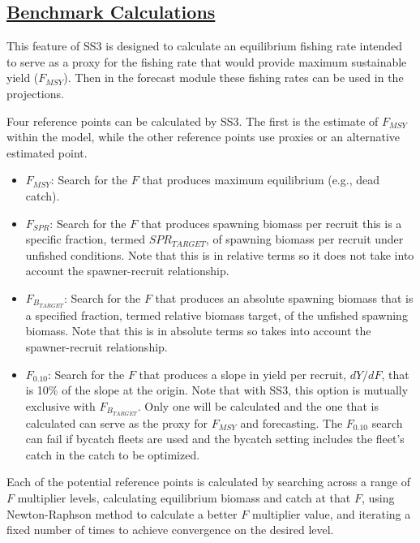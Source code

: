 \hypertarget{Benchmark}{}
\subsection[Benchmark Calculations]{\protect\hyperlink{Benchmark}{Benchmark Calculations}}
This feature of SS3 is designed to calculate an equilibrium fishing rate intended to serve as a proxy for the fishing rate that would provide maximum sustainable yield ($F_{MSY}$). Then in the forecast module these fishing rates can be used in the projections.

Four reference points can be calculated by SS3. The first is the estimate of $F_{MSY}$ within the model, while the other reference points use proxies or an alternative estimated point.

\begin{itemize}
	\item $F_{MSY}$: Search for the $F$ that produces maximum equilibrium (e.g., dead catch).
	
	\item $F_{SPR}$: Search for the $F$ that produces spawning biomass per recruit this is a specific fraction, termed $SPR_{TARGET}$, of spawning biomass per recruit under unfished conditions. Note that this is in relative terms so it does not take into account the spawner-recruit relationship.
	
	\item $F_{B_{TARGET}}$: Search for the $F$ that produces an absolute spawning biomass that is a specified fraction, termed relative biomass target, of the unfished spawning biomass. Note that this is in absolute terms so takes into account the spawner-recruit relationship. 
	
	\item $F_{0.10}$: Search for the $F$ that produces a slope in yield per recruit, $dY/dF$, that is 10\% of the slope at the origin. Note that with SS3, this option is mutually exclusive with $F_{B_{TARGET}}$. Only one will be calculated and the one that is calculated can serve as the proxy for $F_{MSY}$ and forecasting. The $F_{0.10}$ search can fail if bycatch fleets are used and the bycatch setting includes the fleet's catch in the catch to be optimized.
\end{itemize}

Each of the potential reference points is calculated by searching across a range of $F$ multiplier levels, calculating equilibrium biomass and catch at that $F$, using Newton-Raphson method to calculate a better $F$ multiplier value, and iterating a fixed number of times to achieve convergence on the desired level.

